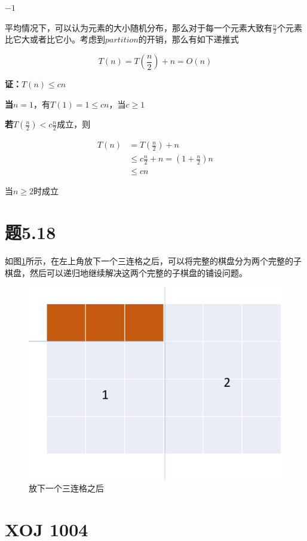 \documentclass[a4paper,twoside]{article}
\begin{document}
\begin{spacing}{1.2}
\begin{algorithm}
\begin{algorithmic}[1]
	\State \Return $-1$
	\EndProcedure
\end{algorithmic}
\end{algorithm}

平均情况下，可以认为元素的大小随机分布，那么对于每一个元素大致有$\frac{n}{2}$个元素比它大或者比它小。考虑到$partition$的开销，那么有如下递推式

$$
T(n)=T(\frac{n}{2})+n=O(n)
$$

\textbf{证：}$T(n) \le cn$

\textbf{当}$n=1$，有$T(1)=1\le cn$，当$c\ge 1$

\textbf{若}$T(\frac{n}{2})<c\frac{n}{2}$成立，则

\begin{align*}
	T(n)&=T(\frac{n}{2})+n\\
	&\le c\frac{n}{2}+n =(1+\frac{n}{2})n \\
	&\le cn
\end{align*}

当$n\ge 2$时成立

\section{题5.18}


如图\ref{fig:chese}所示，在左上角放下一个三连格之后，可以将完整的棋盘分为两个完整的子棋盘，然后可以递归地继续解决这两个完整的子棋盘的铺设问题。

\begin{figure}[h]
	\centering
	\label{fig:chese}
	\caption{放下一个三连格之后}
	\includegraphics[width=0.8\linewidth]{cheseboard.png}
\end{figure}

\clearpage

\section{XOJ 1004}


\end{spacing}
\end{document}

